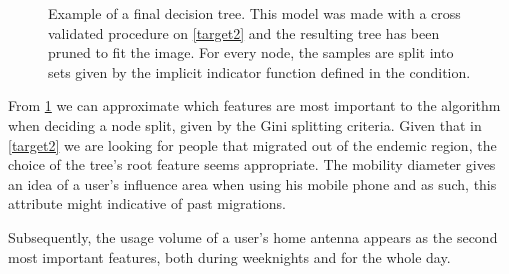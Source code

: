 \begin{figure}
    \centering
    \caption{ Example of a final decision tree.
        This model was made with a cross validated procedure on \cref{target2} and the resulting tree has been pruned to fit the image.
        For every node, the samples are split into sets given by the implicit indicator function defined in the condition.}
    \label{fig:decision_tree_actual_problem}
\end{figure}




\smallskip


From \cref{fig:decision_tree_actual_problem} we can approximate which features are most important to the algorithm when deciding a node split, given by the Gini splitting criteria.
Given that in \cref{target2} we are looking for people that migrated out of the endemic region, the choice of the tree's root feature seems appropriate.
The mobility diameter gives an idea of a user's influence area when using his mobile phone and as such, this attribute might indicative of past migrations.

Subsequently, the usage volume of a user's home antenna appears as the second most important features, both during weeknights and for the whole day.

